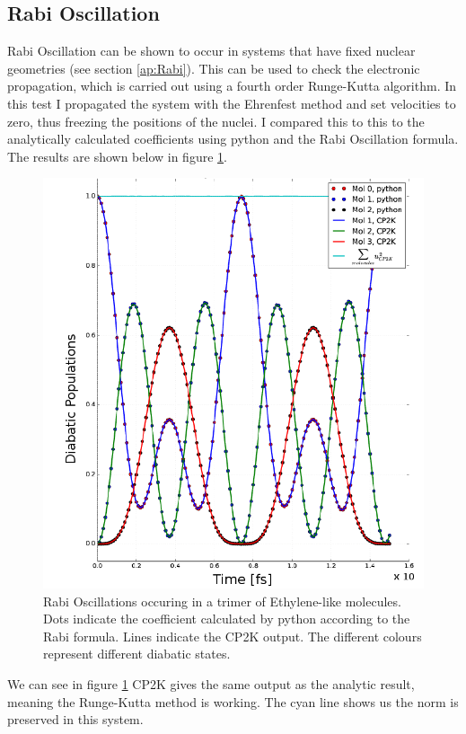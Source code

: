 \subsection{Rabi Oscillation}
Rabi Oscillation can be shown to occur in systems that have fixed nuclear geometries (see section \ref{ap:Rabi}). This can be used to check the electronic propagation, which is carried out using a fourth order Runge-Kutta algorithm. In this test I propagated the system with the Ehrenfest method and set velocities to zero, thus freezing the positions of the nuclei. I compared this to this to the analytically calculated coefficients using python and the Rabi Oscillation formula. The results are shown below in figure \ref{fig:Rabi}.
\begin{figure}[H]
  \includegraphics[height=0.5\textheight]{./img/Rabi_Oscillation_trimer.png}
  \caption{\label{fig:Rabi}Rabi Oscillations occuring in a trimer of Ethylene-like molecules. Dots indicate the coefficient calculated by python according to the Rabi formula. Lines indicate the CP2K output. The different colours represent different diabatic states.}
\end{figure}
\noindent We can see in figure \ref{fig:Rabi} CP2K gives the same output as the analytic result, meaning the Runge-Kutta method is working. The cyan line shows us the norm is preserved in this system.
\\
